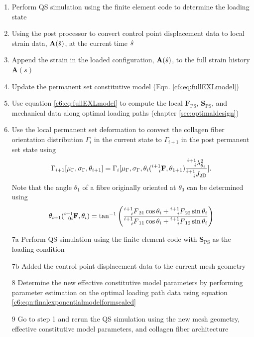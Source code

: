     \begin{enumerate}
        \item Perform QS simulation using the finite element code to determine the loading state
        \item Using the post processor to convert control point displacement data to local strain data, $\mathbf{A}(\Hat{s})$, at the current time $\Hat{s}$
        \item Append the strain in the loaded configuration, $\mathbf{A}(\Hat{s})$, to the full strain history $\mathbf{A}(s)$
        \item Update the permanent set constitutive model (Eqn. \ref{c6:eq:fullEXLmodel})
        \item Use equation \ref{c6:eq:fullEXLmodel} to compute the local $\mathbf{F}_\mathrm{PS}$, 
        $\mathbf{S}_\mathrm{PS}$, and mechanical data along optimal loading paths (chapter \ref{sec:optimaldesign})
        \item Use the local permanent set deformation to convect the collagen fiber orientation distribution $\Gamma_i$ in the current state to $\Gamma_{i+1}$ in the post permanent set state using 
        \begin{equation}\label{c6:eqn:45}
        \begin{aligned}
        \Gamma_{i+1}[\mu_\Gamma,\sigma_\Gamma, \theta_{i+1}] = \Gamma_i[\mu_\Gamma, \sigma_\Gamma, \theta_i(\prescript{i+1}{i}{\mathbf{F}},\theta_{1+1})\frac{\prescript{i+1}{i}{\lambda}_{\theta_i}^2}{\prescript{i+1}{i}{J_\mathrm{2D}}}].
        \end{aligned}
        \end{equation}
        Note that the angle $\theta_1$ of a fibre originally oriented at $\theta_0$ can be determined using
        \begin{equation}\label{c6:eqn:46}
        \begin{aligned}
        \theta_{i+1}(\prescript{i+1}{0i}{\mathbf{F}},\theta_i) = \tan^{-1}\left(\frac{\prescript{i+1}{i}{F}_{21}\cos{\theta_i} + \prescript{i+1}{i}{F}_{22}\sin{\theta_i}}{\prescript{i+1}{i}{F}_{11}\cos{\theta_i} + \prescript{i+1}{i}{F}_{12}\sin{\theta_i}}\right)
        \end{aligned}
        \end{equation}
        \item[7a] Perform QS simulation using the finite element code with $\mathbf{S}_\mathrm{PS}$ as the loading condition
        \item[7b] Added the control point displacement data to the current mesh geometry
        \item[8] Determine the new effective constitutive model parameters by performing parameter estimation on the optimal loading path data using equation \ref{c6:eqn:finalexponentialmodelformscaled}
        \item[9] Go to step 1 and rerun the QS simulation using the new mesh geometry, effective constitutive model parameters, and collagen fiber architecture
    \end{enumerate}
